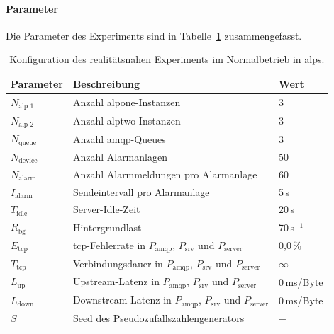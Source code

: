 \newpage

\paragraph{Parameter}

Die Parameter des Experiments sind in Tabelle~\ref{tab:exp-alps-normal-config} zusammengefasst.

\begin{table}[H]
    \centering
    \renewcommand{\arraystretch}{1.2}
    \caption{Konfiguration des realitätsnahen Experiments im Normalbetrieb in \acrshort{alps}.}
    \label{tab:exp-alps-normal-config}
    \begin{tabular}{|l|l|l|}
        \hline
        \textbf{Parameter}  & \textbf{Beschreibung}                                                               & \textbf{Wert} \\
        \hline
        $N_{\text{alp~1}}$  & Anzahl \gls{alpone}-Instanzen                                                       & 3             \\
        $N_{\text{alp~2}}$  & Anzahl \gls{alptwo}-Instanzen                                                       & 3             \\
        $N_{\text{queue}}$  & Anzahl \gls{amqp}-Queues                                                            & 3             \\
        $N_{\text{device}}$ & Anzahl Alarmanlagen                                                                 & 50            \\
        $N_{\text{alarm}}$  & Anzahl Alarmmeldungen pro Alarmanlage                                               & 60            \\
        $I_{\text{alarm}}$  & Sendeintervall pro Alarmanlage                                                      & 5\,s          \\
        $T_{\text{idle}}$   & Server-Idle-Zeit                                                                    & 20\,s         \\
        $R_{\text{bg}}$     & Hintergrundlast                                                                     & 70\,s$^{-1}$  \\
        $E_{\text{tcp}}$    & \gls{tcp}-Fehlerrate in $P_{\text{amqp}}$, $P_{\text{srv}}$ und $P_{\text{server}}$ & 0{,}0\,\%     \\
        $T_{\text{tcp}}$    & Verbindungsdauer in $P_{\text{amqp}}$, $P_{\text{srv}}$ und $P_{\text{server}}$     & $\infty$      \\
        $L_{\text{up}}$     & Upstream-Latenz in $P_{\text{amqp}}$, $P_{\text{srv}}$ und $P_{\text{server}}$      & 0\,ms/Byte    \\
        $L_{\text{down}}$   & Downstream-Latenz in $P_{\text{amqp}}$, $P_{\text{srv}}$ und $P_{\text{server}}$    & 0\,ms/Byte    \\
        $S$                 & Seed des Pseudozufallszahlengenerators                                              & $-$           \\
        \hline
    \end{tabular}
\end{table}

